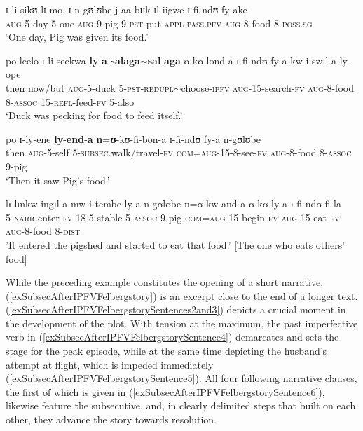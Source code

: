 \begin{exe}
\ex \label{exSubsecPigDuck}
\begin{xlist}
\ex \label{exSubsecPigDuckSentence1}\gll ɪ-li-sikʊ lɪ-mo, ɪ-n-gʊlʊbe j-aa-bɪɪk-ɪl-iigwe ɪ-fi-ndʊ fy-ake\\
\textsc{aug}-5-day 5-one \textsc{aug}-9-pig 9-\textsc{pst}-put-\textsc{appl}-\textsc{pass.pfv} \textsc{aug}-8-food 8-\textsc{poss.sg}\\
\glt `One day, Pig was given its food.'

\ex\label{exSubsecPigDuckSentence2}\gll po leelo ɪ-li-seekwa \textbf{ly}-\textbf{a}-\textbf{salaga}$\sim$\textbf{sal}-\textbf{aga} ʊ-kʊ-lond-a ɪ-fi-ndʊ fy-a kw-i-swɪl-a ly-ope\\
then now/but \textsc{aug}-5-duck 5-\textsc{pst}-\textsc{redupl}$\sim$choose-\textsc{ipfv} \textsc{aug}-15-search-\textsc{fv} \textsc{aug}-8-food 8-\textsc{assoc} 15-\textsc{refl}-feed-\textsc{fv} 5-also\\
\glt `Duck was pecking for food to feed itself.'

\ex\label{exSubsecPigDuckSentence3}\gll po ɪ-ly-ene \textbf{ly}-\textbf{end}-\textbf{a} \textbf{n}=\textbf{ʊ}-kʊ-fi-bon-a ɪ-fi-ndʊ fy-a n-gʊlʊbe\\
then \textsc{aug}-5-self 5-\textsc{subsec}.walk/travel-\textsc{fv} \textsc{com}=\textsc{aug}-15-8-see-\textsc{fv} \textsc{aug}-8-food 8-\textsc{assoc} 9-pig\\
\glt `Then it saw Pig's food.'

\ex\label{exSubsecPigDuckSentence4}\gll lɪ-lɪnkw-ingɪl-a mw-i-tembe ly-a n-gʊlʊbe n=ʊ-kw-and-a ʊ-kʊ-ly-a ɪ-fi-ndʊ fi-la\\
5-\textsc{narr}-enter-\textsc{fv} 18-5-stable 5-\textsc{assoc} 9-pig \textsc{com}=\textsc{aug}-15-begin-\textsc{fv} \textsc{aug}-15-eat-\textsc{fv} \textsc{aug}-8-food 8-\textsc{dist}\\ \largerpage
\glt  '‎‎It entered the pigshed and started to eat that food.' [The one who eats others' food]
\end{xlist}
\end{exe}

While the preceding example constitutes the opening of a short narrative, (\ref{exSubsecAfterIPFVFelbergstory}) is an excerpt close to the end of a longer text.
(\ref{exSubsecAfterIPFVFelbergstorySentences2and3}) depicts a crucial moment in the development of the plot. With tension at the maximum, the past imperfective verb in (\ref{exSubsecAfterIPFVFelbergstorySentence4}) demarcates and sets the stage for the peak episode, while at the same time depicting the husband's attempt at flight, which is impeded immediately (\ref{exSubsecAfterIPFVFelbergstorySentence5}). All four following narrative clauses, the first of which is given in (\ref{exSubsecAfterIPFVFelbergstorySentence6}), likewise feature the subsecutive, and, in clearly delimited steps that built on each other, they advance the story towards resolution.

